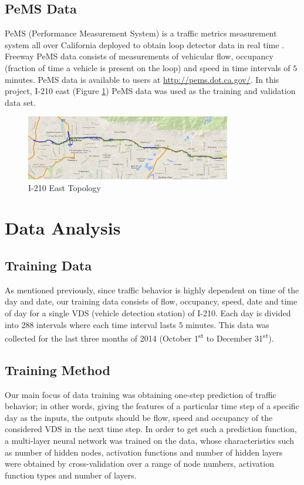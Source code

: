 \documentclass[11pt]{article}
\begin{document}
\subsection{PeMS Data} 
PeMS (Performance Measurement System) is a traffic metrics measurement system all over California deployed to obtain loop detector data in real time \cite{PemsPravin}. Freeway PeMS data consists of measurements of vehicular flow, occupancy (fraction of time a vehicle is present on the loop) and speed in time intervals of $5$ minutes. PeMS data is available to users at \url{http://pems.dot.ca.gov/}. In this project, I-210 east (Figure \ref{fig:210}) PeMS data was used as the training and validation data set. 
\begin{figure}[p]
    \centering
    \includegraphics[width=0.8\textwidth]{210.png}
    \caption{I-210 East Topology}
    \label{fig:210}
\end{figure} 


\section{Data Analysis}

\subsection{Training Data}
As mentioned previously, since traffic behavior is highly dependent on time of the day and date, our training data consists of flow, occupancy, speed, date and time of day for a single VDS (vehicle detection station) of I-210. Each day is divided into 288 intervals where each time interval lasts $5$ minutes. This data was collected for the last three months of 2014 (October 1\textsuperscript{st} to December 31\textsuperscript{st}).
\subsection{Training Method}
Our main focus of data training was obtaining one-step prediction of traffic behavior; in other words, giving the features of a particular time step of a specific day as the inputs, the outputs should be flow, speed and occupancy of the considered VDS in the next time step. In order to get such a prediction function, a multi-layer neural network was trained on the data, whose characteristics such as number of hidden nodes, activation functions and number of hidden layers were obtained by cross-validation over a range of node numbers, activation function types and number of layers.
 




\end{document}
